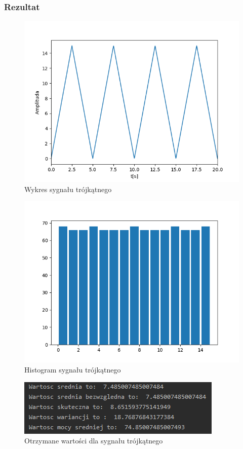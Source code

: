 \documentclass[12pt]{article}
\begin{document}
\subsubsection{Rezultat}
\begin{figure}[H]
\centering
\includegraphics[scale=0.8]{sygTrojkatWykres.png}
\caption{Wykres sygnału trójkątnego}
\end{figure}
\begin{figure}[H]
\centering
\includegraphics[scale=0.8]{sygTrojkatHist.png}
\caption{Histogram sygnału trójkątnego}
\end{figure}
\begin{figure}[H]
\centering
\includegraphics[scale=0.8]{sygTrojkatParam.png}
\caption{Otrzymane wartości dla sygnału trójkątnego}
\end{figure}
\end{document}
